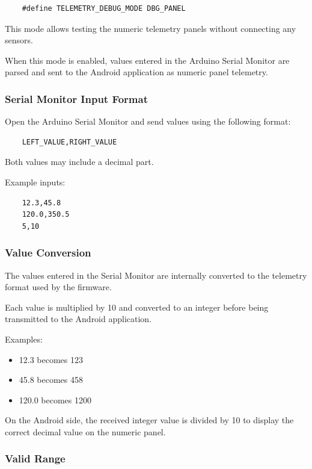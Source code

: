 \begin{verbatim}
	#define TELEMETRY_DEBUG_MODE DBG_PANEL
\end{verbatim}

This mode allows testing the numeric telemetry panels without connecting
any sensors.

When this mode is enabled, values entered in the Arduino Serial Monitor
are parsed and sent to the Android application as numeric panel telemetry.

\subsubsection{Serial Monitor Input Format}

Open the Arduino Serial Monitor and send values using the following format:

\begin{verbatim}
	LEFT_VALUE,RIGHT_VALUE
\end{verbatim}

Both values may include a decimal part.

Example inputs:

\begin{verbatim}
	12.3,45.8
	120.0,350.5
	5,10
\end{verbatim}

\subsubsection{Value Conversion}

The values entered in the Serial Monitor are internally converted to the
telemetry format used by the firmware.

Each value is multiplied by 10 and converted to an integer before being
transmitted to the Android application.

Examples:

\begin{itemize}
	\item 12.3 becomes 123
	\item 45.8 becomes 458
	\item 120.0 becomes 1200
\end{itemize}

On the Android side, the received integer value is divided by 10 to
display the correct decimal value on the numeric panel.

\subsubsection{Valid Range}

